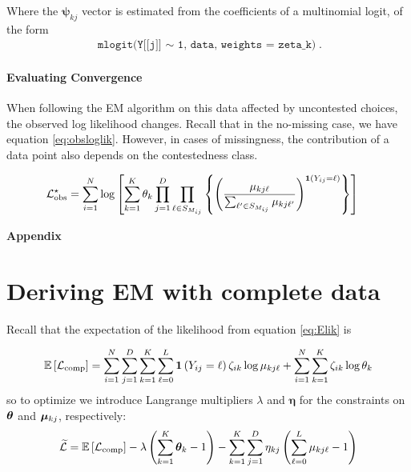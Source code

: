 \documentclass[11pt]{article}
\begin{document}
Where the \(\bm\psi_{kj}\) vector is estimated from the coefficients of a multinomial logit, of the form 
\begin{align*}
\texttt{mlogit(Y[[j]] \(\sim\) 1, data, weights = zeta\_k)}.
\end{align*}

\paragraph{Evaluating Convergence} When following the EM algorithm on this data affected by uncontested choices, the observed log likelihood changes. Recall that in the no-missing case,  we have equation \ref{eq:obsloglik}. However, in cases of missingness, the contribution of a data point also depends on the contestedness class.

\begin{align*}
{\mathcal{L}}^{\star}_{\text{obs}} &= \sum^{N}_{i=1}\log \left[\sum^{K}_{k=1}\theta_k \prod^{D}_{j=1}\prod_{\ell \in S_{M_{ij}}}\left\{\left(\frac{\mu_{kj\ell}}{\sum_{\ell^\prime \in S_{M_{ij}}} \mu_{kj\ell^\prime}}\right)^{\bm{1}\left(Y_{ij} = \ell\right)}\right\}\right]
\end{align*}


\newpage
\appendix

\begin{centering}
\textbf{\large{Appendix}}
\end{centering}

\section{Deriving EM with complete data}

Recall that the expectation of the likelihood from equation \ref{eq:Elik} is

\begin{align*}
\mathbb{E}\left[\mathcal{L}_{\text{comp}}\right] = \sum^{N}_{i=1}\sum^{D}_{j=1}\sum^{K}_{k=1}\sum^{L}_{\ell = 0}\bm{1}\left(Y_{ij} = \ell\right) \zeta_{ik}\log\mu_{kj\ell} +  
\sum^{N}_{i=1}\sum^{K}_{k=1}\zeta_{ik}\log \theta_{k}
\end{align*}
so to optimize we introduce Langrange multipliers \(\lambda\) and \(\bm{\eta}\) for the constraints on \(\bm{\theta}\) and \(\bm{\mu}_{kj}\), respectively:
\begin{align}
\widetilde{\mathcal{L}} = \mathbb{E}\left[\mathcal{L}_\text{comp}\right] - \lambda\left(\sum^{K}_{k=1}\bm{\theta}_k - 1\right) - \sum^{K}_{k=1}\sum^{D}_{j=1}\eta_{kj}\left(\sum^{L}_{\ell=0}\mu_{kj\ell} - 1\right)
\end{align}
\end{document}

